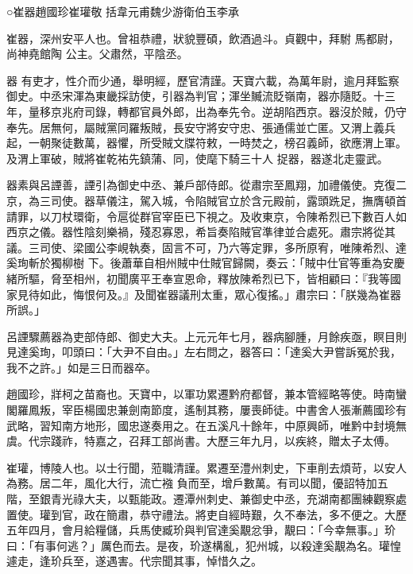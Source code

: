 
\begin{pinyinscope}

 ○崔器趙國珍崔瓘敬
 括韋元甫魏少游衛伯玉李承



 崔器，深州安平人也。曾祖恭禮，狀貌豐碩，飲酒過斗。貞觀中，拜駙
 馬都尉，尚神堯館陶
 公主。父肅然，平陰丞。



 器
 有吏才，性介而少通，舉明經，歷官清謹。天寶六載，為萬年尉，逾月拜監察御史。中丞宋渾為東畿採訪使，引器為判官；渾坐贓流貶嶺南，器亦隨貶。十三年，量移京兆府司錄，轉都官員外郎，出為奉先令。逆胡陷西京。器沒於賊，仍守奉先。居無何，屬賊黨同羅叛賊，長安守將安守忠、張通儒並亡匿。又渭上義兵起，一朝聚徒數萬，器懼，所受賊文牒符敕，一時焚之，榜召義師，欲應渭上軍。及渭上軍破，賊將崔乾祐先鎮蒲、同，使麾下騎三十人
 捉器，器遂北走靈武。



 器素與呂諲善，諲引為御史中丞、兼戶部侍郎。從肅宗至鳳翔，加禮儀使。克復二京，為三司使。器草儀注，駕入城，令陷賊官立於含元殿前，露頭跣足，撫膺頓首請罪，以刀杖環衛，令扈從群官宰臣已下視之。及收東京，令陳希烈已下數百人如西京之儀。器性陰刻樂禍，殘忍寡恩，希旨奏陷賊官準律並合處死。肅宗將從其議。三司使、梁國公李峴執奏，固言不可，乃六等定罪，多所原宥，唯陳希烈、達奚珣斬於獨柳樹
 下。後蕭華自相州賊中仕賊官歸闕，奏云：「賊中仕官等重為安慶緒所驅，脅至相州，初聞廣平王奉宣恩命，釋放陳希烈已下，皆相顧曰：『我等國家見待如此，悔恨何及。』及聞崔器議刑太重，眾心復搖。」肅宗曰：「朕幾為崔器所誤。」



 呂諲驟薦器為吏部侍郎、御史大夫。上元元年七月，器病腳腫，月餘疾亟，瞑目則見達奚珣，叩頭曰：「大尹不自由。」左右問之，器答曰：「達奚大尹嘗訴冤於我，我不之許。」如是三日而器卒。



 趙國珍，牂柯之苗裔也。天寶中，以軍功累遷黔府都督，兼本管經略等使。時南蠻閣羅鳳叛，宰臣楊國忠兼劍南節度，遙制其務，屢喪師徒。中書舍人張漸薦國珍有武略，習知南方地形，國忠遂奏用之。在五溪凡十餘年，中原興師，唯黔中封境無虞。代宗踐祚，特嘉之，召拜工部尚書。大歷三年九月，以疾終，贈太子太傅。



 崔瓘，博陵人也。以士行聞，蒞職清謹。累遷至澧州刺史，下車削去煩苛，以安人為務。居二年，風化大行，流亡襁
 負而至，增戶數萬。有司以聞，優詔特加五階，至銀青光祿大夫，以甄能政。遷潭州刺史、兼御史中丞，充湖南都團練觀察處置使。瓘到官，政在簡肅，恭守禮法。將吏自經時艱，久不奉法，多不便之。大歷五年四月，會月給糧儲，兵馬使臧玠與判官達奚覯忿爭，覯曰：「今幸無事。」玠曰：「有事何逃？」厲色而去。是夜，玠遂構亂，犯州城，以殺達奚覯為名。瓘惶遽走，逢玠兵至，遂遇害。代宗聞其事，悼惜久之。




\end{pinyinscope}
